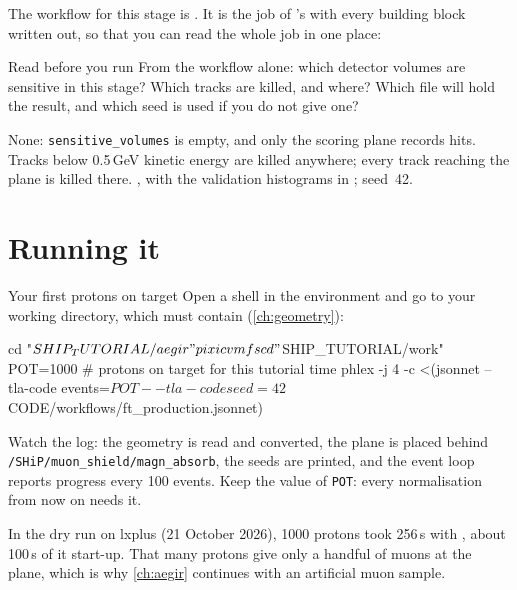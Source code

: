 The workflow for this stage is .
It is the job of 's 
with every building block written out, so that you can read the whole job in
one place:


\begin{exercise}{Read before you run}
From the workflow alone: which detector volumes are sensitive in this stage?
Which tracks are killed, and where? Which file will hold the result, and
which seed is used if you do not give one?
\end{exercise}

\begin{solution}
None: \texttt{sensitive\_volumes} is empty, and only the scoring plane records
hits. Tracks below 0.5\,GeV kinetic energy are killed anywhere; every track
reaching the plane is killed there. , with the
validation histograms in ; seed~42.
\end{solution}

\section{Running it}

\begin{exercise}{Your first protons on target}
\label{ex:production}
Open a shell in the  environment and go to your working
directory, which must contain  (\cref{ch:geometry}):
\begin{shell}
cd "$SHIP_TUTORIAL/aegir"
pixi cvmfs
cd "$SHIP_TUTORIAL/work"
POT=1000                         # protons on target for this tutorial
time phlex -j 4 -c <(jsonnet --tla-code events=$POT --tla-code seed=42 \
    $CODE/workflows/ft_production.jsonnet)
\end{shell}
Watch the log: the geometry is read and converted, the plane is placed behind
\texttt{/SHiP/muon\_shield/magn\_absorb}, the seeds are printed, and the event
loop reports progress every 100 events. Keep the value of \texttt{POT}: every
normalisation from now on needs it.
\end{exercise}

\begin{organisernote}
In the dry run on lxplus (21 October 2026), 1000 protons took 256\,s with
\cmd{-j 4}, about 100\,s of it start-up. That many
protons give only a handful of muons at the plane, which is why
\cref{ch:aegir} continues with an artificial muon sample.
\end{organisernote}


